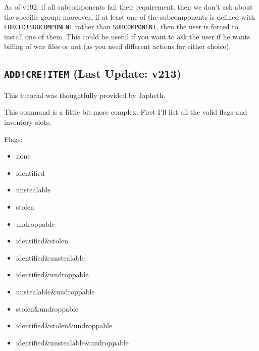 \documentclass{article}
\def\DEFINE#1{{\tt \bf #1}\label{#1}\index{#1}}
\def\t#1{{\tt #1}}
\begin{document}
As of v192, if all subcomponents fail their requirement, then we don't ask about
the specific group; moreover, if at least one of the subcomponents is defined with
\t{FORCED!SUBCOMPONENT} rather than \t{SUBCOMPONENT}, then the user is forced to
install one of them. This could be useful if you want to ask the user if he wants
biffing of wav files or not (as you need different actions for either choice).

\subsection{\DEFINE{ADD!CRE!ITEM} (Last Update: v213)}
This tutorial was thoughtfully provided by Japheth.

This command is a little bit more complex.  First I'll list all the valid
flags and inventory slots.

Flags:
\begin{itemize}
\item none
\item identified
\item unstealable
\item stolen
\item undroppable
\item identified\&stolen
\item identified\&unstealable
\item identified\&undroppable
\item unstealable\&undroppable
\item stolen\&undroppable
\item identified\&stolen\&undroppable
\item identified\&unstealable\&undroppable
\end{itemize}
\end{document}
